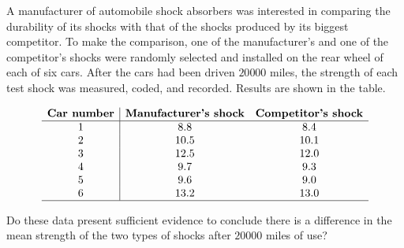
\begin{exercise}

A manufacturer of automobile shock absorbers was interested in comparing the durability of its shocks with that of the shocks produced by its biggest competitor.
To make the comparison, one of the manufacturer's and one of the competitor's shocks were randomly selected and installed on the rear wheel of each of six cars.
After the cars had been driven $20 000$ miles, the strength of each test shock was measured, coded, and recorded.
Results are shown in the table.

\begin{align*}
    \begin{array}{c|cc}
        \textbf{Car number}
        &
        \textbf{Manufacturer's shock}
        &
        \textbf{Competitor's shock} \\
        \hline
        1 & 8.8  & 8.4  \\
        2 & 10.5 & 10.1 \\
        3 & 12.5 & 12.0 \\
        4 & 9.7  & 9.3  \\
        5 & 9.6  & 9.0  \\
        6 & 13.2 & 13.0 \\
        \hline
    \end{array}
\end{align*}

Do these data present sufficient evidence to conclude there is a difference in the mean strength of the two types of shocks after $20 000$ miles of use?

\end{exercise}


\begin{solution}

\phantom{}

\end{solution}


